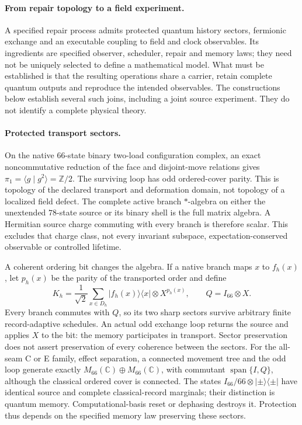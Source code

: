 \paragraph{From repair topology to a field experiment.}
A specified repair process admits protected quantum history sectors,
fermionic exchange and an executable coupling to field and clock observables.
Its ingredients are specified observer, scheduler, repair and memory laws;
they need not be uniquely selected to define a mathematical model.
What must be established is that the resulting operations share a carrier,
retain complete quantum outputs and reproduce the intended observables.
The constructions below establish several such joins, including a joint
source experiment. They do not identify a complete physical theory.

\paragraph{Protected transport sectors.}
On the native $66$-state binary two-load configuration complex, an exact
noncommutative reduction of the face and disjoint-move relations gives
$\pi_1=\langle g\mid g^2\rangle=\mathbb Z/2$.
The surviving loop has odd ordered-cover parity. This is topology of the
declared transport and deformation domain, not topology of a localized
field defect. The complete active branch $*$-algebra on either
the unextended $78$-state source or its binary shell is the full matrix
algebra. A Hermitian source charge commuting with every branch is therefore
scalar. This excludes that charge class, not every invariant subspace,
expectation-conserved observable or controlled lifetime.

A coherent ordering bit changes the algebra. If a native branch maps
$x$ to $f_h(x)$, let $p_h(x)$ be the parity of the transported order and define
\[
 K_h=\frac1{\sqrt2}\sum_{x\in D_h}
 |f_h(x)\rangle\langle x|\otimes X^{p_h(x)},\qquad
 Q=I_{66}\otimes X.
\]
Every branch commutes with $Q$, so its two sharp sectors survive arbitrary
finite record-adaptive schedules. An actual odd exchange loop returns
the source and applies $X$ to the bit: the memory participates in transport.
Sector preservation does not assert preservation of every coherence
between the sectors. For the all-seam C or E family, effect separation,
a connected movement tree and the odd loop generate exactly
$M_{66}(\mathbb C)\oplus M_{66}(\mathbb C)$, with commutant
$\operatorname{span}\{I,Q\}$, although the classical ordered cover is connected.
The states $I_{66}/66\otimes|\pm\rangle\langle\pm|$ have identical source
and complete classical-record marginals; their distinction is quantum
memory. Computational-basis reset or dephasing destroys it. Protection
thus depends on the specified memory law preserving these sectors.

